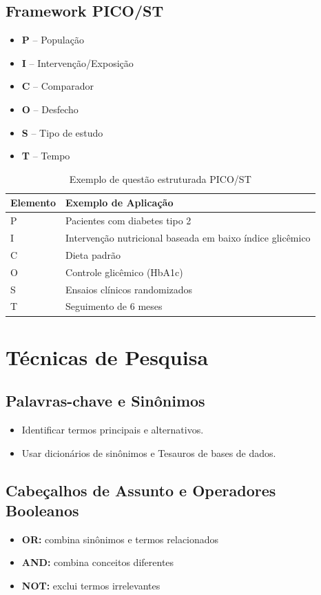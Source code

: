 \documentclass[12pt,a4paper]{article}
\begin{document}
\subsection{Framework PICO/ST}
\begin{itemize}
    \item \textbf{P} – População
    \item \textbf{I} – Intervenção/Exposição
    \item \textbf{C} – Comparador
    \item \textbf{O} – Desfecho
    \item \textbf{S} – Tipo de estudo
    \item \textbf{T} – Tempo
\end{itemize}

\begin{table}[h!]
\centering
\begin{tabular}{p{2.5cm} p{10cm}}
\toprule
Elemento & Exemplo de Aplicação \\
\midrule
P & Pacientes com diabetes tipo 2 \\
I & Intervenção nutricional baseada em baixo índice glicêmico \\
C & Dieta padrão \\
O & Controle glicêmico (HbA1c) \\
S & Ensaios clínicos randomizados \\
T & Seguimento de 6 meses \\
\bottomrule
\end{tabular}
\caption{Exemplo de questão estruturada PICO/ST}
\end{table}

\section{Técnicas de Pesquisa}
\subsection{Palavras-chave e Sinônimos}
\begin{itemize}
    \item Identificar termos principais e alternativos.
    \item Usar dicionários de sinônimos e Tesauros de bases de dados.
\end{itemize}

\subsection{Cabeçalhos de Assunto e Operadores Booleanos}
\begin{itemize}
    \item \textbf{OR:} combina sinônimos e termos relacionados
    \item \textbf{AND:} combina conceitos diferentes
    \item \textbf{NOT:} exclui termos irrelevantes
\end{itemize}
\end{document}
